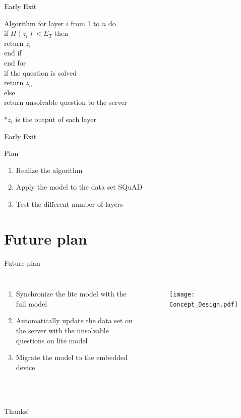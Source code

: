 \documentclass[12pt]{beamer}
\begin{document}
\begin{frame}{Early Exit}
    \begin{block}{Algorithm}
    for layer $i$ from 1 to $n$ do\\
    \qquad if $H(z_i) < E_T$ then \\
    \qquad \qquad return $z_i$\\
    \qquad end if\\
    end for\\
    if the question is solved \\
    \qquad return $z_n$\\
    else \\
    \qquad return unsolvable question to the server\\
    \end{block}
    \small{*$z_i$ is the output of each layer}
\end{frame}

\begin{frame}{Early Exit}
    \begin{block}{Plan}
    \begin{enumerate}[*]
        \item Realize the algorithm
        \item Apply the model to the data set SQuAD
        \item Test the different number of layers
    \end{enumerate}
    \end{block}
    

\end{frame}

\section{Future plan}
\begin{frame}{Future plan}
    \begin{columns}
	\begin{enumerate}[*]
        \item Synchronize the lite model with the full model
        \item Automatically update the data set on the server with the unsolvable questions on lite model 
        \item Migrate the model to the embedded device
    \end{enumerate}
	\bigskip
	\bigskip
	\bigskip
	\bigskip
	\bigskip
	\bigskip
	\begin{figure}[H]
    \centering
    \texttt{[image: Concept\_Design.pdf]}
    \end{figure}
\end{columns}
\end{frame}



\section{}
\begin{frame}{}
    \begin{center}
        \Huge Thanks!
    \end{center}
\end{frame}
\end{document}
